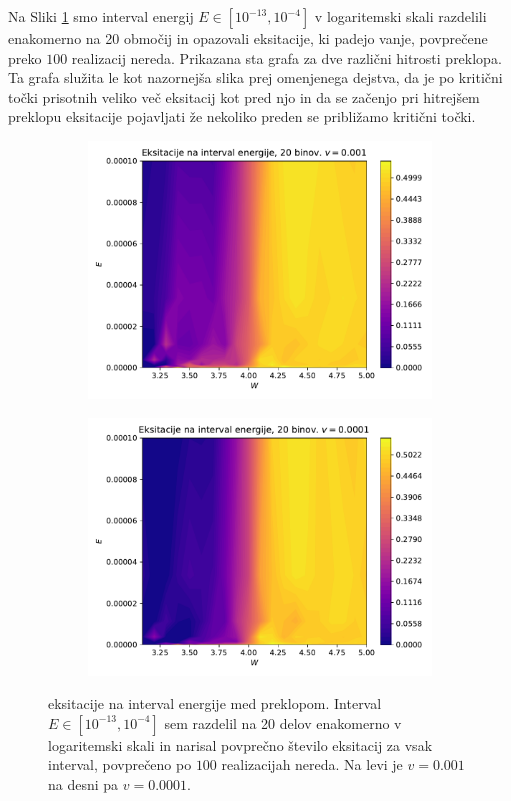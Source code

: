 Na Sliki \ref{fig:EksBini} smo interval energij $E \in [10^{-13},10^{-4}]$ v logaritemski skali razdelili enakomerno na 20 območij in opazovali eksitacije, ki padejo vanje, povprečene preko $100$ realizacij nereda. Prikazana sta grafa za dve različni hitrosti preklopa. Ta grafa služita le kot nazornejša slika prej omenjenega dejstva, da je po kritični točki prisotnih veliko več eksitacij kot pred njo in da se začenjo pri hitrejšem preklopu eksitacije pojavljati že nekoliko preden se približamo kritični točki.
\begin{figure}[H]
\centering
\begin{subfigure}{.49\textwidth}
\includegraphics[trim=0 0 0 22.5,clip,width=\linewidth]{Figures/EksBini1.pdf}
\end{subfigure}
\begin{subfigure}{.49\textwidth}
\includegraphics[trim=0 0 0 22.5,clip,width=\linewidth]{Figures/EksBini2.pdf}
\end{subfigure}
\caption{eksitacije na interval energije med preklopom. Interval $E \in [10^{-13},10^{-4}]$ sem razdelil na 20 delov enakomerno v logaritemski skali in narisal povprečno število eksitacij za vsak interval, povprečeno po $100$ realizacijah nereda. Na levi je $v=0.001$ na desni pa $v=0.0001$.}
\label{fig:EksBini}
\end{figure}
